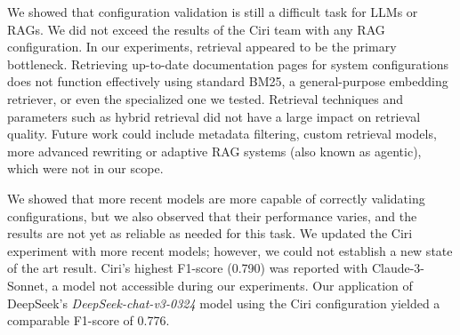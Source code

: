 We showed that configuration validation is still a difficult task for LLMs or RAGs. We did not exceed the results of the Ciri team with any RAG configuration. In our experiments, retrieval appeared to be the primary bottleneck. Retrieving up-to-date documentation pages for system configurations does not function effectively using standard BM25, a general-purpose embedding retriever, or even the specialized one we tested. Retrieval techniques and parameters such as hybrid retrieval did not have a large impact on retrieval quality. Future work could include metadata filtering, custom retrieval models, more advanced rewriting or adaptive RAG systems (also known as agentic), which were not in our scope.

We showed that more recent models are more capable of correctly validating configurations, but we also observed that their performance varies, and the results are not yet as reliable as needed for this task. We updated the Ciri experiment with more recent models; however, we could not establish a new state of the art result. Ciri's highest F1-score (0.790) was reported with Claude-3-Sonnet, a model not accessible during our experiments. Our application of DeepSeek's \textit{DeepSeek-chat-v3-0324} model using the Ciri configuration yielded a comparable F1-score of 0.776.